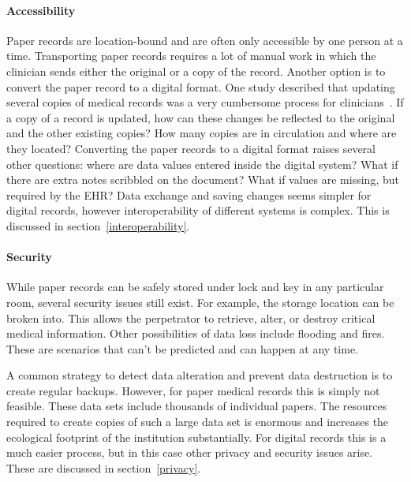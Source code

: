     \paragraph{Accessibility} Paper records are location-bound and are often only accessible by one person at a time. Transporting paper records requires a lot of manual work in which the clinician sends either the original or a copy of the record. Another option is to convert the paper record to a digital format. One study described that updating several copies of medical records was a very cumbersome process for clinicians~\cite{Tange1999}. If a copy of a record is updated, how can these changes be reflected to the original and the other existing copies? How many copies are in circulation and where are they located? Converting the paper records to a digital format raises several other questions: where are data values entered inside the digital system? What if there are extra notes scribbled on the document? What if values are missing, but required by the EHR\@? Data exchange and saving changes seems simpler for digital records, however interoperability of different systems is complex. This is discussed in section~\ref{interoperability}.

    \paragraph{Security} While paper records can be safely stored under lock and key in any particular room, several security issues still exist. For example, the storage location can be broken into. This allows the perpetrator to retrieve, alter, or destroy critical medical information. Other possibilities of data loss include flooding and fires. These are scenarios that can't be predicted and can happen at any time. 

    A common strategy to detect data alteration and prevent data destruction is to create regular backups. However, for paper medical records this is simply not feasible. These data sets include thousands of individual papers. The resources required to create copies of such a large data set is enormous and increases the ecological footprint of the institution substantially. For digital records this is a much easier process, but in this case other privacy and security issues arise. These are discussed in section~\ref{privacy}.\bigskip

